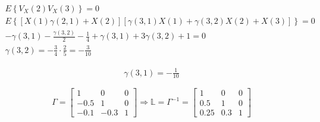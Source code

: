 \begin{equation*}
\begin{gathered}
	E\left\lbrace V_X(2) V_X(3) \right\rbrace = 0 \\
	E\left\lbrace \left[ X(1) \gamma(2,1) + X(2) \right] \left[ \gamma(3,1)X(1) + \gamma(3,2)X(2) + X(3)\right] \right\rbrace = 0 \\
	-\gamma(3,1) - \frac{\gamma(3,2)}{2} - \frac{1}{4} + \gamma(3,1) + 3 \gamma(3,2) + 1  = 0 \\
	\gamma(3,2) = - \frac{3}{4} \cdot \frac{2}{5} = -\frac{3}{10}
\end{gathered}
\end{equation*}

\begin{equation*}
\begin{gathered}
	\gamma(3,1) = -\frac{1}{10}
\end{gathered}
\end{equation*}

\begin{equation*}
	\Gamma = \begin{bmatrix}
		1 & 0 & 0 \\
		-0.5 & 1 & 0 \\
		-0.1 & -0.3 & 1
	\end{bmatrix}
	\Longrightarrow \mathbb{L} = \Gamma^{-1} =
	\begin{bmatrix}
		1 & 0 & 0 \\
		0.5 & 1 & 0 \\
		0.25 & 0.3 & 1
	\end{bmatrix}
\end{equation*}	

